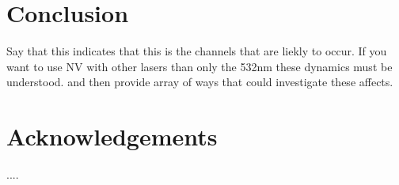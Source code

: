 \documentclass[preprint,prl,twocolumn]{revtex4}
\begin{document}
\section{Conclusion}
Say that this indicates that this is the channels that are liekly to occur. If you want to use NV with other lasers than only the 532nm these dynamics must be understood. and then provide array of ways that could investigate these affects.
    


\section*{Acknowledgements}

....

%
%
%




\begin{thebibliography}{27}






\end{thebibliography}
\end{document}
